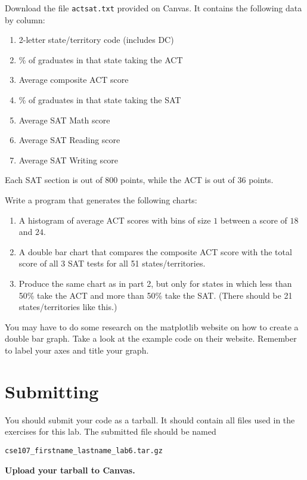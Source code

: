 \documentclass[11pt]{cselabheader}
\begin{document}
\begin{ex}[testscores.py]
  Download the file \texttt{actsat.txt} provided on Canvas. It contains the
  following data by column:

  \begin{enumerate}
    \item 2-letter state/territory code (includes DC)
    \item \% of graduates in that state taking the ACT
    \item Average composite ACT score
    \item \% of graduates in that state taking the SAT
    \item Average SAT Math score
    \item Average SAT Reading score
    \item Average SAT Writing score
  \end{enumerate}

  Each SAT section is out of 800 points, while the ACT is out of 36 points.

  Write a program that generates the following charts:
  \begin{enumerate}
    \item A histogram of average ACT scores with bins of size $1$ between a
      score of $18$ and $24$.
    \item A double bar chart that compares the composite ACT score with the
      total score of all 3 SAT tests for all 51 states/territories.
    \item Produce the same chart as in part 2, but only for states in which
      less than 50\% take the ACT and more than 50\% take the SAT. (There
      should be 21 states/territories like this.)
  \end{enumerate}

  You may have to do some research on the matplotlib website on how to create
  a double bar graph. Take a look at the example code on their website.
  Remember to label your axes and title your graph.
\end{ex}

\section{Submitting}

You should submit your code as a tarball. It should contain all files
used in the exercises for this lab. The submitted file should be named
\begin{center}
  \texttt{cse107\_firstname\_lastname\_lab6.tar.gz}
\end{center}

\begin{center}
  \textbf{Upload your tarball to Canvas.}
\end{center}

\listoftheorems
\end{document}
